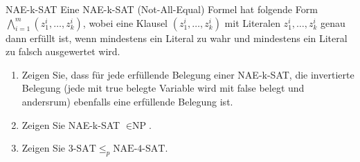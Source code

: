 \documentclass{article}
\begin{document}
\begin{exercise}{NAE-k-SAT}
  Eine NAE-k-SAT (Not-All-Equal) Formel hat folgende Form $\bigwedge_{i=1}^m (z_1^i, \dots, z_k^i)$, wobei eine Klausel $(z_1^i, \dots, z_k^i)$ mit Literalen $z_1^i, \dots, z_k^i$ genau dann erfüllt ist, wenn mindestens ein Literal zu wahr und mindestens ein Literal zu falsch ausgewertet wird.
  \begin{enumerate}
    \item Zeigen Sie, dass für jede erfüllende Belegung einer NAE-k-SAT, die invertierte Belegung (jede mit true belegte Variable wird mit false belegt und andersrum) ebenfalls eine erfüllende Belegung ist.
    \item Zeigen Sie NAE-k-SAT $\in \text{NP}$.
    \item Zeigen Sie $3\text{-SAT} \leq_p \text{NAE-4-SAT}$.
  \end{enumerate}


\end{exercise}
\end{document}
